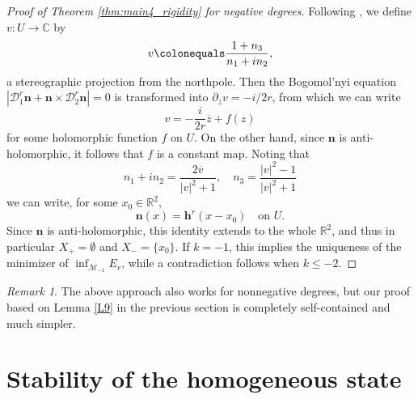 \documentclass{amsart}
\numberwithin{equation}{section}
\theoremstyle{definition}
\theoremstyle{remark}
\newtheorem{remark}[theorem]{Remark}
\newcommand{\R}{\mathbb{R}}
\newcommand{\C}{\mathbb{C}}
\newcommand{\boD}{\mathcal{D}}
\newcommand{\boM}{\mathcal{M}}
\newcommand{\ovl}[1]{\overline{#1}}					%
\newcommand{\rd}{{\partial}}								%
\newcommand{\bh}{{\mathbf{h}}}
\newcommand{\bn}{{\mathbf{n}}}
\begin{document}
\begin{proof}[Proof of Theorem \ref{thm:main4_rigidity} for negative degrees]
    Following \cite{MR4091507}, we define $v:U\to\C$ by
    \begin{align*}
        v\colonequals \frac{1+n_3}{n_1+in_2},
    \end{align*}
    a stereographic projection from the northpole.
    Then the Bogomol'nyi equation $|\boD^r_1\bn + \bn\times \boD^r_2\bn| = 0$ is transformed into
    $\rd_{\ovl{z}} v = -i/2r$, from which we can write
    \begin{equation}\label{familysol}
    v= -\frac{i}{2r} \ovl{z} + f(z)
    \end{equation}
    for some holomorphic function $f$ on $U$. On the other hand, since $\bn$ is anti-holomorphic, it follows that $f$ is a constant map.
    Noting that
    \begin{equation}\label{eq:v_to_n}
        n_1+in_2=\frac{2\ovl{v}}{|v|^2+1}, \quad n_3=\frac{|v|^2-1}{|v|^2+1}
    \end{equation}
    we can write, for some $x_0\in \R^2$,
    $$
    \bn (x) = \bh^{r}(x-x_0)\quad \text{on } U.
    $$
    Since $\bn$ is anti-holomorphic, this identity extends to the whole $\R^2$, and thus in particular $X_+ = \emptyset$ and $X_-=\{x_0\}$.
    If $k=-1$, this implies the uniqueness of the minimizer of $\inf_{\boM_{-1}}E_r$, while a contradiction follows when $k\le -2$.
\end{proof}

\begin{remark}
    The above approach also works for nonnegative degrees, but our proof based on Lemma \ref{L9} in the previous section is completely self-contained and much simpler.
\end{remark}







\section{Stability of the homogeneous state}\label{sec:stability}
\end{document}
